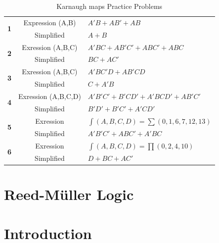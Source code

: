 \begin{table}[H]
  \sffamily
  \begin{center}
    \begin{tabular}{c c p{6cm} }
      \multirow{2}{*}{\textbf{1}} 
      & Expression (A,B) & $ A'B+AB'+AB $ \\
      & \cellcolor{gray!10} Simplified 
      & \cellcolor{gray!10} $ A+B $ \\
      \hline
      \multirow{2}{*}{\textbf{2}} 
      & Exression (A,B,C) & $ A'BC+AB'C'+ABC'+ABC $ \\
      & \cellcolor{gray!10} Simplified 
      & \cellcolor{gray!10} $ BC+AC' $ \\
      \hline
      \multirow{2}{*}{\textbf{3}} 
      & Exression (A,B,C) & $ A'BC'D+AB'CD $ \\
      & \cellcolor{gray!10} Simplified 
      & \cellcolor{gray!10} $ C+A'B $ \\
      \hline
      \multirow{2}{*}{\textbf{4}} 
      & Exression (A,B,C,D) & $ A'B'C'+B'CD'+A'BCD'+AB'C' $ \\
      & \cellcolor{gray!10} Simplified 
      & \cellcolor{gray!10} $ B'D'+B'C'+A'CD' $ \\
      \hline
      \multirow{2}{*}{\textbf{5}} 
      & Exression & $ \int(A,B,C,D) = \sum(0,1,6,7,12,13) $ \\
      & \cellcolor{gray!10} Simplified 
      & \cellcolor{gray!10} $ A'B'C'+ABC'+A'BC $ \\
      \hline
      \multirow{2}{*}{\textbf{6}} 
      & Exression & $ \int(A,B,C,D) = \prod(0,2,4,10) $ \\
      & \cellcolor{gray!10} Simplified 
      & \cellcolor{gray!10} $ D+BC+AC' $ \\
    \end{tabular}
  \end{center}
  \caption{Karnaugh maps Practice Problems}
  \label{KM:tab:kmap_practice_problems}
\end{table}

\clearpage\section{Reed-M\"{u}ller Logic}
\label{KM:sec:reed-muller_logic}

\section{Introduction}
\label{KM:sec:introduction_to_reed-muller_logic}

